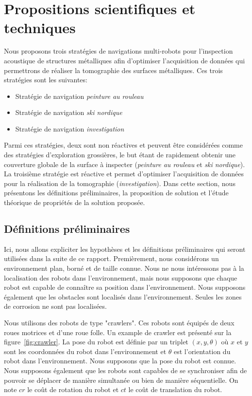 \documentclass[francais,RandD]{rapportPFE}
\begin{document}
	\section{Propositions scientifiques et techniques}
		Nous proposons trois stratégies de navigations multi-robots pour l'inspection acoustique de structures métalliques afin d'optimiser l'acquisition de données qui permettrons de réaliser la tomographie des surfaces métalliques. Ces trois stratégies sont les suivantes:
		\begin{itemize}
			\item Stratégie de navigation \textit{peinture au rouleau}
			\item Stratégie de navigation \textit{ski nordique}
			\item Stratégie de navigation \textit{investigation}
		\end{itemize}
		Parmi ces stratégies, deux sont non réactives et peuvent être considérées comme des stratégies d'exploration grossières, le but étant de rapidement obtenir une couverture globale de la surface à inspecter (\textit{peinture au rouleau} et \textit{ski nordique}).
		La troisième stratégie est réactive et permet d'optimiser l'acquisition de données pour la réalisation de la tomographie (\textit{investigation}).
		Dans cette section, nous présentons les définitions préliminaires, la proposition de solution et l'étude théorique de propriétés de la solution proposée.
		\subsection{Définitions préliminaires}
			Ici, nous allons expliciter les hypothèses et les définitions préliminaires qui seront utilisées dans la suite de ce rapport.
			Premièrement, nous considérons un environnement plan, borné et de taille connue.
			Nous ne nous intéressons pas à la localisation des robots dans l'environnement, mais nous supposons que chaque robot est capable de connaître sa position dans l'environnement.
			Nous supposons également que les obstacles sont localisés dans l'environnement.
			Seules les zones de corrosion ne sont pas localisées.

			Nous utilisons des robots de type "crawlers". Ces robots sont équipés de deux roues motrices et d'une roue folle.
			Un example de crawler est présenté sur la figure~\ref{fig:crawler}.
			La pose du robot est définie par un triplet $(x, y, \theta)$ où $x$ et $y$ sont les coordonnées du robot dans l'environnement et $\theta$ est l'orientation du robot dans l'environnement.
			Nous supposons que la pose du robot est connue.
			Nous supposons également que les robots sont capables de se synchroniser afin de pouvoir se déplacer de manière simultanée ou bien de manière séquentielle.
			On note $cr$ le coût de rotation du robot et $ct$ le coût de translation du robot.
\end{document}
